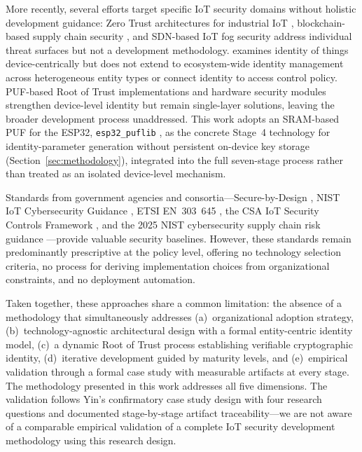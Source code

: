 \documentclass[preprint,12pt,authoryear]{elsarticle}
\begin{document}
More recently, several efforts target specific IoT security domains without holistic development guidance: Zero Trust architectures for industrial IoT \citep{zanasi2024flexible, fernandez2024critical}, blockchain-based supply chain security \citep{ray2024blockchain, fernando2023cyber}, and SDN-based IoT fog security \citep{javanmardi2023sdn, turner2023promising} address individual threat surfaces but not a development methodology. \citet{visintin2024secure} examines identity of things device-centrically but does not extend to ecosystem-wide identity management across heterogeneous entity types or connect identity to access control policy. PUF-based Root of Trust implementations \citep{sassalou2025puf} and hardware security modules \citep{bakiris12025iot} strengthen device-level identity but remain single-layer solutions, leaving the broader development process unaddressed. This work adopts an SRAM-based PUF for the ESP32, \texttt{esp32\_puflib} \citep{stanicek2022esp32puflib}, as the concrete Stage~4 technology for identity-parameter generation without persistent on-device key storage (Section~\ref{sec:methodology}), integrated into the full seven-stage process rather than treated as an isolated device-level mechanism.

Standards from government agencies and consortia---Secure-by-Design \citep{ukgov2024sbdprinciples}, NIST IoT Cybersecurity Guidance \citep{NIST_IoT_2020}, ETSI EN~303~645 \citep{etsi_en303645}, the CSA IoT Security Controls Framework \citep{csa_iot_framework_2023}, and the 2025 NIST cybersecurity supply chain risk guidance \citep{licata2025developing}---provide valuable security baselines. However, these standards remain predominantly prescriptive at the policy level, offering no technology selection criteria, no process for deriving implementation choices from organizational constraints, and no deployment automation.

Taken together, these approaches share a common limitation: the absence of a methodology that simultaneously addresses (a)~organizational adoption strategy, (b)~technology-agnostic architectural design with a formal entity-centric identity model, (c)~a dynamic Root of Trust process establishing verifiable cryptographic identity, (d)~iterative development guided by maturity levels, and (e)~empirical validation through a formal case study with measurable artifacts at every stage. The methodology presented in this work addresses all five dimensions. The validation follows Yin's \citeyearpar{yin2014case} confirmatory case study design with four research questions and documented stage-by-stage artifact traceability---we are not aware of a comparable empirical validation of a complete IoT security development methodology using this research design.
\end{document}
